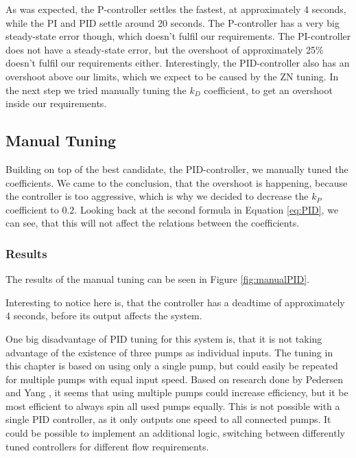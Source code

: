 
As was expected, the P-controller settles the fastest,
at approximately 4 seconds,
while the PI and PID settle around 20 seconds.
The P-controller has a very big steady-state error though,
which doesn't fulfil our requirements.
The PI-controller does not have a steady-state error,
but the overshoot of approximately 25\% doesn't fulfil our requirements either.
Interestingly, the PID-controller also has an overshoot above our limits,
which we expect to be caused by the ZN tuning.
In the next step we tried manually tuning the $k_D$ coefficient,
to get an overshoot inside our requirements.

\subsection{Manual Tuning}\label{sub:manualPID}
Building on top of the best candidate, the PID-controller,
we manually tuned the coefficients.
We came to the conclusion,
that the overshoot is happening, because the controller is too aggressive,
which is why we decided to decrease the $k_P$ coefficient to $0.2$.
Looking back at the second formula in Equation \ref{eq:PID},
we can see, that this will not affect the relations between the coefficients.

\subsubsection{Results}
The results of the manual tuning can be seen in Figure \ref{fig:manualPID}.

Interesting to notice here is,
that the controller has a deadtime of approximately 4 seconds,
before its output affects the system.


One big disadvantage of PID tuning for this system is,
that it is not taking advantage of the existence of three pumps as  individual inputs.
The tuning in this chapter is based on using only a single pump,
but could easily be repeated for multiple pumps with equal input speed.
Based on research done by Pedersen and Yang \cite{YangMultiPump2008},
it seems that using multiple pumps could increase efficiency,
but it be most efficient to always spin all used pumps equally.
This is not possible with a single PID controller,
as it only outputs one speed to all connected pumps.
It could be possible to implement an additional logic,
switching between differently tuned controllers for different flow requirements.